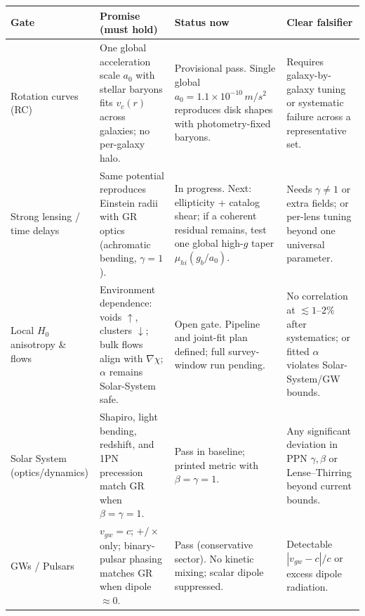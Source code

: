 \documentclass[
]{article}
\begin{document}
\begin{longtable}[]{@{}
  >{\raggedright\arraybackslash}p{}
  >{\raggedright\arraybackslash}p{}
  >{\raggedright\arraybackslash}p{}
  >{\raggedright\arraybackslash}p{}@{}}
\toprule\noalign{}
\begin{minipage}[b]{\linewidth}\raggedright
\textbf{Gate}
\end{minipage} & \begin{minipage}[b]{\linewidth}\raggedright
\textbf{Promise (must hold)}
\end{minipage} & \begin{minipage}[b]{\linewidth}\raggedright
\textbf{Status now}
\end{minipage} & \begin{minipage}[b]{\linewidth}\raggedright
\textbf{Clear falsifier}
\end{minipage} \\
\midrule\noalign{}
\endhead
\bottomrule\noalign{}
\endlastfoot
Rotation curves (RC) & One global acceleration scale \(a_{0}\) with
stellar baryons fits \(v_{c}(r)\) across galaxies; no per-galaxy halo. &
Provisional pass. Single global
\(a_{0} = 1.1 \times 10^{- 10}\, m/s^{2}\) reproduces disk shapes with
photometry-fixed baryons. & Requires galaxy-by-galaxy tuning or
systematic failure across a representative set. \\
Strong lensing / time delays & Same potential reproduces Einstein radii
with GR optics (achromatic bending, \(\gamma = 1\)). & In progress.
Next: ellipticity + catalog shear; if a coherent residual remains, test
one global high-\(g\) taper \(\mu_{hi}(g_{b}/a_{0})\). & Needs
\(\gamma \neq 1\) or extra fields; or per-lens tuning beyond one
universal parameter. \\
Local \(H_{0}\) anisotropy \& flows & Environment dependence: voids
\(\uparrow\), clusters \(\downarrow\); bulk flows align with
\(\nabla\chi\); \(\alpha\) remains Solar-System safe. & Open gate.
Pipeline and joint-fit plan defined; full survey-window run pending. &
No correlation at \(\lesssim 1\)--\(2\%\) after systematics; or fitted
\(\alpha\) violates Solar-System/GW bounds. \\
Solar System (optics/dynamics) & Shapiro, light bending, redshift, and
1PN precession match GR when \(\beta = \gamma = 1\). & Pass in baseline;
printed metric with \(\beta = \gamma = 1\). & Any significant deviation
in PPN \(\gamma,\beta\) or Lense--Thirring beyond current bounds. \\
GWs / Pulsars & \(v_{gw} = c\); \(+ / \times\) only; binary-pulsar
phasing matches GR when dipole \(\approx 0\). & Pass (conservative
sector). No kinetic mixing; scalar dipole suppressed. & Detectable
\(|v_{gw} - c|/c\) or excess dipole radiation. \\
\end{longtable}
\end{document}
